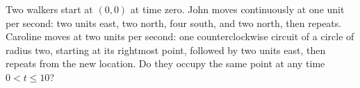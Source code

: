 Two walkers start at $(0,0)$ at time zero. John moves continuously at one unit per second: two units east, two north, four south, and two north, then repeats. Caroline moves at two units per second: one counterclockwise circuit of a circle of radius two, starting at its rightmost point, followed by two units east, then repeats from the new location. Do they occupy the same point at any time $0<t\le10$?
